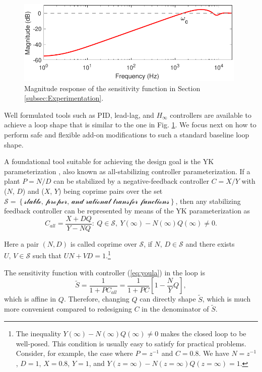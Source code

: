 \documentclass [11pt, proquest] {uwthesis}[2020/02/24]
\begin{document}
\begin{figure}[!ht]
\begin{centering}
\includegraphics[width=11cm]{Loop-shaping/baseline_SISO_S_mag_3}
\par\end{centering}
\caption{\label{fig:A-typical-magnitude}Magnitude response of the sensitivity
function in Section \ref{subsec:Experimentation}.}
\end{figure}

Well formulated tools such as PID, lead-lag, and $H_{\infty}$ controllers
are available to achieve a loop shape that is similar to the one in
Fig. \ref{fig:A-typical-magnitude}. We focus next on how to perform
safe and flexible add-on modifications to such a standard baseline
loop shape.

A foundational tool suitable for achieving the design goal is the
YK parameterization \cite{youla1976modern,kucera1975stability}, also
known as all-stabilizing controller parameterization. If a plant $P=N/D$
can be stabilized by a negative-feedback controller $C=X/Y$ with
($N$, $D$) and ($X$, $Y$) being coprime pairs over the set $\mathcal{S=\left\{ \text{stable, proper, and rational transfer functions}\right\} }$,
then any stabilizing feedback controller can be represented by means
of the YK parameterization as
\begin{equation}
C_{all}=\frac{X+DQ}{Y-NQ}:\ Q\in\mathcal{S},\ Y(\infty)-N(\infty)Q(\infty)\neq0.\label{eq:youla}
\end{equation}

Here a pair $\left(N,D\right)$ is called coprime over $\mathcal{S}$,
if $N,\,D\in\mathcal{S}$ and there exists $U,\,V\in\mathcal{S}$
such that $UN+VD=1$.\footnote{The inequality $Y(\infty)-N(\infty)Q(\infty)\neq0$ makes the closed
loop to be well-posed. This condition is usually easy to satisfy for
practical problems. Consider, for example, the case where $P=z^{-1}$
and $C=0.8$. We have $N=z^{-1}$, $D=1$, $X=0.8$, $Y=1$, and $Y(z=\infty)-N(z=\infty)Q(z=\infty)=1$.} 

The sensitivity function with controller (\ref{eq:youla}) in the
loop is
\begin{equation}
\tilde{S}=\frac{1}{1+PC_{all}}=\frac{1}{1+PC}\left[1-\frac{N}{Y}Q\right],\label{eq:generalYoula_S}
\end{equation}
which is affine in $Q$. Therefore, changing $Q$ can directly shape
$\tilde{S}$, which is much more convenient compared to redesigning
$C$ in the denominator of $\tilde{S}$.
\end{document}

